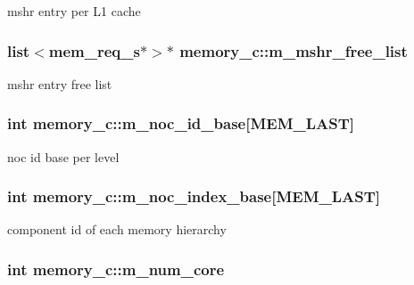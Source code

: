 \label{classmemory__c_ab7b175ea316a51ff771ca652c2dae138}
mshr entry per L1 cache \hypertarget{classmemory__c_a4268b16bf6a1f84172fc1a313a8f44c2}{
\subsubsection[{m\_\-mshr\_\-free\_\-list}]{\setlength{\rightskip}{0pt plus 5cm}list$<${\bf mem\_\-req\_\-s}$\ast$$>$$\ast$ {\bf memory\_\-c::m\_\-mshr\_\-free\_\-list}}}
\label{classmemory__c_a4268b16bf6a1f84172fc1a313a8f44c2}
mshr entry free list \hypertarget{classmemory__c_a7688509a181e0fd29dc6d70f59920f59}{
\subsubsection[{m\_\-noc\_\-id\_\-base}]{\setlength{\rightskip}{0pt plus 5cm}int {\bf memory\_\-c::m\_\-noc\_\-id\_\-base}\mbox{[}MEM\_\-LAST\mbox{]}}}
\label{classmemory__c_a7688509a181e0fd29dc6d70f59920f59}
noc id base per level \hypertarget{classmemory__c_a1bf57a0de8f321201f37c448f7f730e7}{
\subsubsection[{m\_\-noc\_\-index\_\-base}]{\setlength{\rightskip}{0pt plus 5cm}int {\bf memory\_\-c::m\_\-noc\_\-index\_\-base}\mbox{[}MEM\_\-LAST\mbox{]}}}
\label{classmemory__c_a1bf57a0de8f321201f37c448f7f730e7}
component id of each memory hierarchy \hypertarget{classmemory__c_afaf8b643ce736f9ea9b2050b6740e710}{
\subsubsection[{m\_\-num\_\-core}]{\setlength{\rightskip}{0pt plus 5cm}int {\bf memory\_\-c::m\_\-num\_\-core}}}
